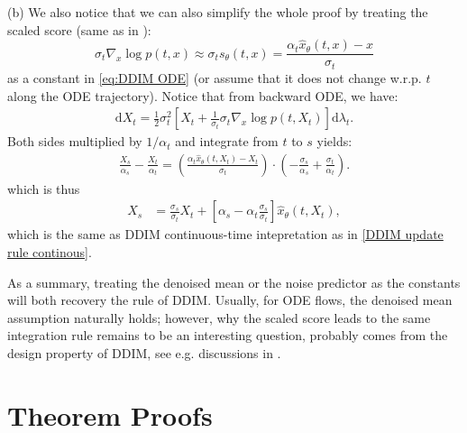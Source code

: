 \documentclass{article}
\theoremstyle{plain}
\theoremstyle{definition}
\theoremstyle{remark}
\begin{document}
(b) We also notice that we can also simplify the whole proof by treating the scaled score (same as in \cite{zhang2022fast}):
\begin{equation}
\label{scaled_score}
\sigma_t\nabla_x \log p(t,x) \approx \sigma_t s_{\theta}(t,x)=\frac{\alpha_t \hat{x}_\theta\left(t,x\right)-x}{\sigma_t}
\end{equation}
as a constant in \eqref{eq:DDIM ODE} (or assume that it does not change w.r.p. $t$ along the ODE trajectory). Notice that from backward ODE, we have:
\begin{equation}
\begin{aligned}
\mathrm{d} X_t =\frac{1}{2} \sigma_t^2\left[X_t+\frac{1}{\sigma_t}\sigma_t\nabla_x \log p(t,X_t)\right] \mathrm{d} \lambda_t .
\end{aligned}
\end{equation}
Both sides multiplied by $1/\alpha_t$ and integrate from $t$ to $s$ yields:
\begin{equation}
\begin{aligned}
\frac{X_s}{\alpha_s}-\frac{X_t}{\alpha_t}=\left(\frac{\alpha_t \hat{x}_\theta\left(t,X_t\right)-X_t}{\sigma_t}\right)\cdot\left(-\frac{\sigma_s}{\alpha_s}+\frac{\sigma_t}{\alpha_t}\right).
\end{aligned}
\end{equation}
which is thus
\begin{equation}
\begin{aligned}
X_s 
&=  \frac{\sigma_s}{\sigma_t}X_t+\left[\alpha_s-\alpha_t \frac{\sigma_s}{\sigma_t} \right] \hat{x}_\theta\left(t,X_t\right),
\end{aligned}
\end{equation}
which is the same as DDIM continuous-time intepretation as in \eqref{DDIM update rule continous}. 

As a summary, treating the denoised mean or the noise predictor as the constants will both recovery the rule of DDIM. Usually, for ODE flows, the denoised mean assumption naturally holds; however, why the scaled score leads to the same integration rule remains to be an interesting question, probably comes from the design property of DDIM, see e.g. discussions in \cite{karras2022elucidating}.

\section{Theorem Proofs}
\end{document}

